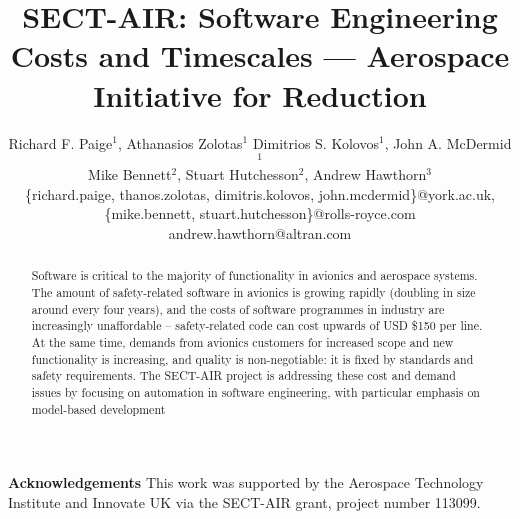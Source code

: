 \documentclass[runningheads,a4paper]{llncs}
\begin{document}
\title{SECT-AIR: Software Engineering Costs and Timescales — Aerospace Initiative for Reduction}

\author{Richard F. Paige$^{1}$, Athanasios Zolotas$^{1}$ Dimitrios S. Kolovos$^{1}$, John A. McDermid$^{1}$\\
Mike Bennett$^{2}$, Stuart Hutchesson$^{2}$, Andrew Hawthorn$^{3}$\\%
%
\footnotesize{
\{richard.paige, thanos.zolotas, dimitris.kolovos, john.mcdermid\}@york.ac.uk, \\
\{mike.bennett, stuart.hutchesson\}@rolls-royce.com\\
andrew.hawthorn@altran.com
}
%
}

\maketitle

\begin{abstract}
Software is critical to the majority of functionality in avionics and aerospace systems. The amount of safety-related software in avionics is growing rapidly (doubling in size around every four years), and the costs of software programmes in industry are increasingly unaffordable -- safety-related code can cost upwards of USD \$150 per line. At the same time, demands from avionics customers for increased scope and new functionality is increasing, and quality is non-negotiable: it is fixed by standards and safety requirements. The SECT-AIR project is addressing these cost and demand issues by focusing on automation in software engineering, with particular emphasis on model-based development
\end{abstract}












\paragraph*{}\textbf{Acknowledgements} This work was supported by the Aerospace Technology Institute and Innovate UK via the SECT-AIR grant, project number 113099.


\end{document}
